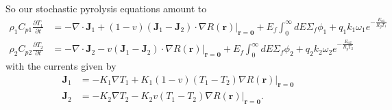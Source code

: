 \documentclass[12pt]{article}
\begin{document}
So our stochastic pyrolysis equations amount to 
\begin{align}
    \rho_1 C_{p1} \frac{\partial T_1}{\partial t}&= -\nabla \cdot \mathbf{J}_1 +(1-v)(\mathbf{J}_1-\mathbf{J}_2)\cdot \nabla R(\mathbf{r}) |_{\mathbf{r}=\mathbf{0}} + E_f \int_0 ^ \infty dE \Sigma_f \phi_1 + q_1 k_1 \omega_1 e^{-\frac{E_{a1}}{R_g T_1}} \\
    \rho_2 C_{p2} \frac{\partial T_2}{\partial t}&= -\nabla \cdot \mathbf{J}_2 -v(\mathbf{J}_1-\mathbf{J}_2)\cdot \nabla R(\mathbf{r}) |_{\mathbf{r}=\mathbf{0}} + E_f \int_0 ^ \infty dE \Sigma_f \phi_2 + q_2 k_2 \omega_2 e^{-\frac{E_{a2}}{R_g T_2}}
\end{align}
with the currents given by 
\begin{align}
    \mathbf{J}_1 &= -K_1 \nabla T_1 +K_1 (1-v)(T_1 -T_2) \nabla R(\mathbf{r})|_{\mathbf{r}=\mathbf{0}} \\
    \mathbf{J}_2 &= -K_2 \nabla T_2 -K_2 v(T_1 -T_2) \nabla R(\mathbf{r})|_{\mathbf{r}=\mathbf{0}}.
\end{align}
\end{document}
